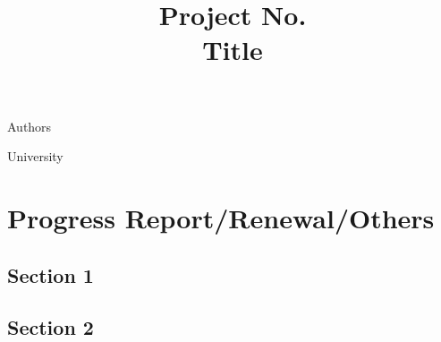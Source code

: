 \documentclass{NSF}
\begin{document}
\title{Project No. \\ Title}
\begin{center}
    \Large{Authors}

    \large{University}
\end{center}

\section{Progress Report/Renewal/Others}

\subsection{Section 1} 
 

\subsection{Section 2}

% 
\end{document}
